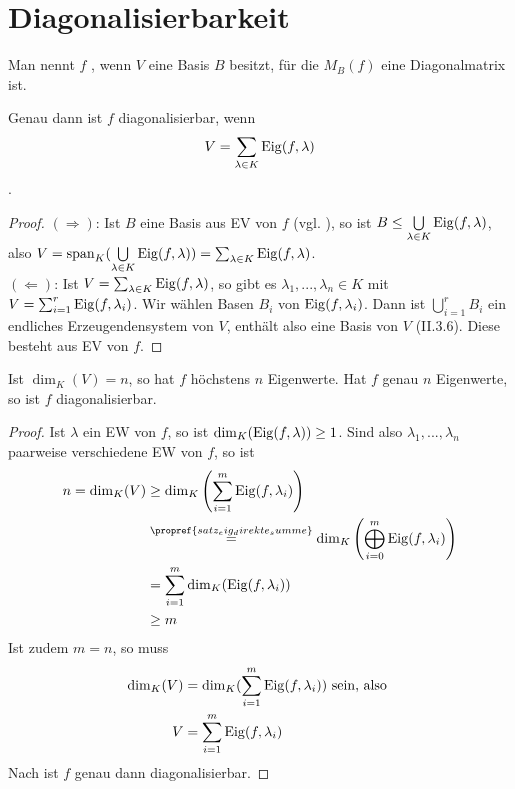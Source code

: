 \section{Diagonalisierbarkeit}

\begin{definition}[diagonalisierbar]
	Man nennt $f$ , wenn $V$ eine Basis $B$ besitzt, für die $M_B(f)$ eine Diagonalmatrix ist.
\end{definition}

\begin{lemma}
	Genau dann ist $f$ diagonalisierbar, wenn
	\begin{align}
		V=\sum\limits_{\lambda\in K} \operatorname{Eig}(f,\lambda) \notag
	\end{align}.
\end{lemma}
\begin{proof}
	$(\Rightarrow)$: Ist $B$ eine Basis aus EV von $f$ (vgl. ), so ist $B\le \bigcup\limits_{\lambda\in K}\operatorname{Eig}(f,\lambda)$, also $V=\operatorname{span}_K(\bigcup\limits_{\lambda\in K}\operatorname{Eig}(f, \lambda))=\sum_{\lambda\in K}\operatorname{Eig}(f,\lambda)$. \\
	$(\Leftarrow)$: Ist $V=\sum_{\lambda\in K}\operatorname{Eig}(f,\lambda)$, so gibt es $\lambda_1,...,\lambda_n \in K$ mit $V=\sum_{i=1}^r \operatorname{Eig}(f,\lambda_i)$. Wir wählen Basen $B_i$ von $\operatorname{Eig}(f,\lambda_i)$. Dann ist $\bigcup\limits_{i=1}^r B_i$ ein endliches Erzeugendensystem von $V$, enthält also eine Basis von $V$ (II.3.6). Diese besteht aus EV von $f$. %
\end{proof}

\begin{proposition}
	Ist $\dim_K(V)=n$, so hat $f$ höchstens $n$ Eigenwerte. Hat $f$ genau $n$ Eigenwerte, so ist $f$ diagonalisierbar.
\end{proposition}
\begin{proof}
	Ist $\lambda$ ein EW von $f$, so ist $\dim_K(\operatorname{Eig}(f,\lambda))\ge 1$. Sind also $\lambda_1,...,\lambda_n$ paarweise verschiedene EW von $f$, so ist
	\begin{align}
		n=\dim_K(V)&\ge \dim_K\left( \sum\limits_{i=1}^m \Eig(f,\lambda_i)\right) \notag \\
		&\overset{\propref{satz_eig_direkte_summe}}{=} \dim_K\left( \bigoplus_{i=0}^{m} \Eig(f,\lambda_i)\right) \notag \\
		&= \sum\limits_{i=1}^m \dim_K(\Eig(f,\lambda_i)) \notag \\
		&\ge m \notag
	\end{align}
	Ist zudem $m=n$, so muss 
	\begin{align}
		\dim_K(V) &= \dim_K(\sum\limits_{i=1}^m \operatorname{Eig}(f,\lambda_i))\text{ sein, also }\notag \\
		V&= \sum\limits_{i=1}^m \operatorname{Eig}(f,\lambda_i) \notag
	\end{align}
	Nach  ist $f$ genau dann diagonalisierbar.
\end{proof}

